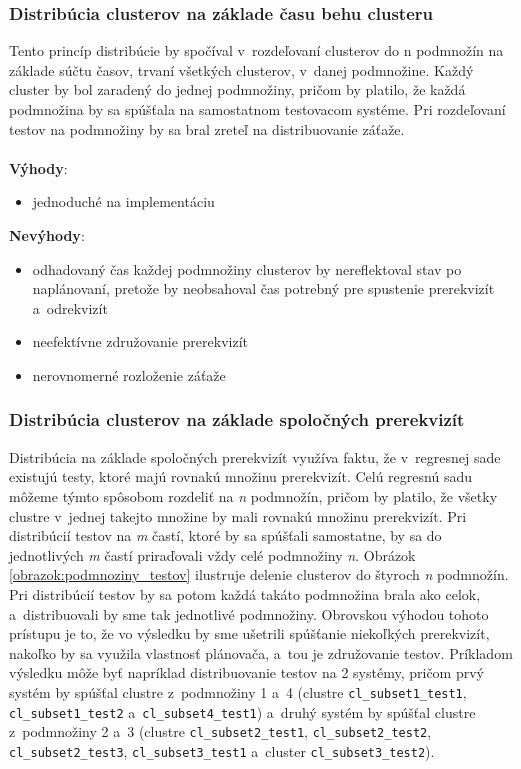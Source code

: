 \subsubsection*{Distribúcia clusterov na základe času behu clusteru}
Tento princíp distribúcie by spočíval v~rozdeľovaní clusterov do n podmnožín na základe súčtu časov, 
trvaní všetkých clusterov, v~danej podmnožine. Každý cluster by bol zaradený do jednej podmnožiny, pričom by platilo,
že každá podmnožina by sa spúšťala na samostatnom testovacom systéme. Pri rozdeľovaní testov na podmnožiny by sa bral zreteľ na
distribuovanie záťaže.
\\
\\
\noindent \textbf{Výhody}:
\begin{itemize}
\item jednoduché na implementáciu
\end{itemize} 

\noindent \textbf{Nevýhody}:
\begin{itemize}
\item odhadovaný čas každej podmnožiny clusterov by nereflektoval stav po naplánovaní, pretože by
neobsahoval čas potrebný pre spustenie prerekvizít a~odrekvizít
\item neefektívne združovanie prerekvizít
\item nerovnomerné rozloženie záťaže
\end{itemize}

\subsubsection*{Distribúcia clusterov na základe spoločných prerekvizít}
Distribúcia na základe spoločných prerekvizít využíva faktu, že v~regresnej sade existujú testy, ktoré majú rovnakú množinu prerekvizít.
Celú regresnú sadu môžeme týmto spôsobom rozdeliť na \emph{n} podmnožín, pričom by platilo, že všetky clustre v~jednej takejto množine by mali
rovnakú množinu prerekvizít. Pri distribúcií testov na \emph{m} častí, ktoré by sa spúšťali samostatne, by sa do jednotlivých \emph{m} častí
priraďovali vždy celé podmnožiny \emph{n}. Obrázok \ref{obrazok:podmnoziny_testov} ilustruje delenie clusterov do štyroch \emph{n} podmnožín.
Pri distribúcií testov by sa potom každá takáto podmnožina brala ako celok, a~distribuovali by sme tak jednotlivé podmnožiny.
Obrovskou výhodou tohoto prístupu je to, že vo výsledku by sme ušetrili spúšťanie niekoľkých prerekvizít, nakoľko by sa
využila vlastnosť plánovača, a~tou je združovanie testov. Príkladom výsledku môže byť napríklad distribuovanie testov na 2 systémy, 
pričom prvý systém by spúšťal clustre z~podmnožiny 1 a~4 (clustre \texttt{cl\_subset1\_test1}, \texttt{cl\_subset1\_test2} a~\texttt{cl\_subset4\_test1})
a~druhý systém by spúšťal clustre z~podmnožiny 2 a~3 (clustre \texttt{cl\_subset2\_test1}, \texttt{cl\_subset2\_test2}, 
\texttt{cl\_subset2\_test3}, \texttt{cl\_subset3\_test1} a~cluster \texttt{cl\_subset3\_test2}).

